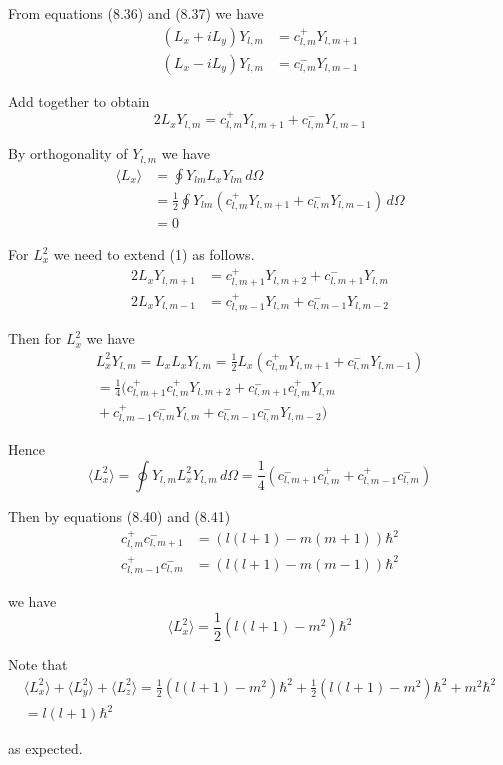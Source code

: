 


From equations (8.36) and (8.37) we have
\begin{align*}
(L_x+iL_y)Y_{l,m}&=c_{l,m}^+Y_{l,m+1}
\\
(L_x-iL_y)Y_{l,m}&=c_{l,m}^-Y_{l,m-1}
\end{align*}

Add together to obtain
\begin{equation*}
2L_xY_{l,m}=c_{l,m}^+Y_{l,m+1}+c_{l,m}^-Y_{l,m-1}
\tag{1}
\end{equation*}

By orthogonality of $Y_{l,m}$ we have
\begin{align*}
\langle L_x\rangle&=\oint Y_{lm}L_xY_{lm}\,d\Omega
\\
&=\frac{1}{2}\oint Y_{lm}\left(c_{l,m}^+Y_{l,m+1}+c_{l,m}^-Y_{l,m-1}\right)\,d\Omega
\\
&=0
\end{align*}

For $L_x^2$ we need to extend (1) as follows.
\begin{align*}
2L_xY_{l,m+1}&=c_{l,m+1}^+Y_{l,m+2}+c_{l,m+1}^-Y_{l,m}
\\
2L_xY_{l,m-1}&=c_{l,m-1}^+Y_{l,m}+c_{l,m-1}^-Y_{l,m-2}
\end{align*}

Then for $L_x^2$ we have
\begin{multline*}
L_x^2Y_{l,m}=L_xL_xY_{l,m}
=\frac{1}{2}L_x\left(c_{l,m}^+Y_{l,m+1}+c_{l,m}^-Y_{l,m-1}\right)
\\
{}=\frac{1}{4}\biggl(
 c_{l,m+1}^+c_{l,m}^+Y_{l,m+2}
+c_{l,m+1}^-c_{l,m}^+Y_{l,m}
\\
{}+c_{l,m-1}^+c_{l,m}^-Y_{l,m}
+c_{l,m-1}^-c_{l,m}^-Y_{l,m-2}
\biggr)
\end{multline*}

Hence
\begin{equation*}
\langle L_x^2\rangle=\oint Y_{l,m}L_x^2Y_{l,m}\,d\Omega=\frac{1}{4}
\left(c_{l,m+1}^-c_{l,m}^++c_{l,m-1}^+c_{l,m}^-\right)
\end{equation*}

Then by equations (8.40) and (8.41)
\begin{align*}
c_{l,m}^+c_{l,m+1}^-&=(l(l+1)-m(m+1))\hbar^2\tag{8.40}
\\
c_{l,m-1}^+c_{l,m}^-&=(l(l+1)-m(m-1))\hbar^2\tag{8.41}
\end{align*}

we have
\begin{equation*}
\langle L_x^2\rangle=\frac{1}{2}\left(l(l+1)-m^2\right)\hbar^2
\end{equation*}

Note that
\begin{multline*}
\langle L_x^2\rangle+\langle L_y^2\rangle+\langle L_z^2\rangle
=\frac{1}{2}\left(l(l+1)-m^2\right)\hbar^2
+\frac{1}{2}\left(l(l+1)-m^2\right)\hbar^2
+m^2\hbar^2
\\
{}=l(l+1)\hbar^2
\end{multline*}

as expected.


